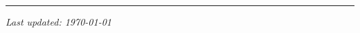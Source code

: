 \documentclass[a4paper, 11pt]{article}
\begin{document}


\medskip
\hrule
\medskip

{


\medskip

%

} %

\vfill
{\footnotesize\textit{Last updated: \monthyeardate\today}}
\end{document}
